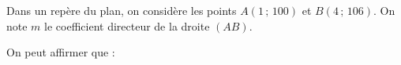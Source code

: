 
Dans un repère du plan, on considère les points $A(1\,;\,100)$ et $B(4\,;\,106)$. On note $m$ le coefficient directeur de la droite $(AB)$.

On peut affirmer que :

\smallskip

